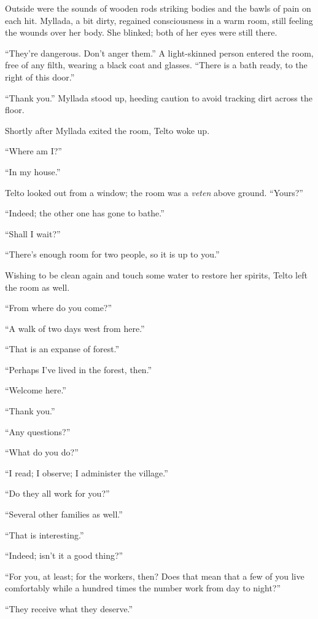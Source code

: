 \centeredstars

Outside were the sounds of wooden rods striking bodies and the bawls of pain on each hit. Myllada, a bit dirty, regained consciousness in a warm room, still feeling the wounds over her body. She blinked; both of her eyes were still there.

``They're dangerous. Don't anger them.'' A light-skinned person entered the room, free of any filth, wearing a black coat and glasses. ``There is a bath ready, to the right of this door.''

``Thank you.'' Myllada stood up, heeding caution to avoid tracking dirt across the floor.

Shortly after Myllada exited the room, Telto woke up.

``Where am I?''

``In my house.''

Telto looked out from a window; the room was a \emph{veten} above ground. ``Yours?''

``Indeed; the other one has gone to bathe.''

``Shall I wait?''

``There's enough room for two people, so it is up to you.''

Wishing to be clean again and touch some water to restore her spirits, Telto left the room as well.

\centeredstars

``From where do you come?''

``A walk of two days west from here.''

``That is an expanse of forest.''

``Perhaps I've lived in the forest, then.''

``Welcome here.''

``Thank you.''

``Any questions?''

``What do you do?''

``I read; I observe; I administer the village.''

``Do they all work for you?''

``Several other families as well.''

``That is interesting.''

``Indeed; isn't it a good thing?''

``For you, at least; for the workers, then? Does that mean that a few of you live comfortably while a hundred times the number work from day to night?''

``They receive what they deserve.''


